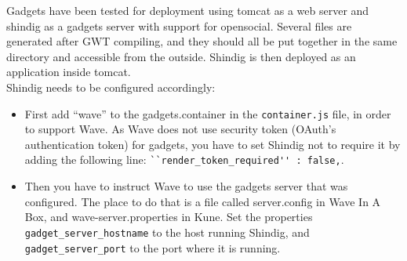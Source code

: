 Gadgets have been tested for deployment using tomcat as a web server and shindig as a gadgets server with support for opensocial. Several files are generated after GWT compiling, and they should all be put together in the same directory and accessible from the outside. Shindig is then deployed as an application inside tomcat.\\[.2cm]
Shindig needs to be configured accordingly:
\begin{itemize}
  \item First add ``wave'' to the gadgets.container in the \verb|container.js| file, in order to support Wave. As Wave does not use security token (OAuth's authentication token) for gadgets, you have to set Shindig not to require it by adding the following line: \verb|``render_token_required'' : false,|.
  \item Then you have to instruct Wave to use the gadgets server that was configured. The place to do that is a file called server.config in Wave In A Box, and wave-server.properties in Kune. Set the properties \verb|gadget_server_hostname| to the host running Shindig, and \verb|gadget_server_port| to the port where it is running.
\end{itemize}


